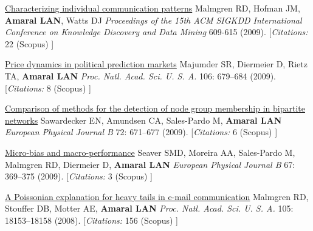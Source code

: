 \NumberedItem{\makebox[0.8cm][r]{[82]}}
\href{/people/amaral/characterizing-individual-communication-patterns}
{Characterizing individual communication patterns}
\newline
Malmgren RD, Hofman JM, {\textbf{Amaral LAN}}, Watts DJ
\newline
\textit{Proceedings of the 15th ACM SIGKDD International Conference on Knowledge Discovery and Data Mining}
609-615 (2009).
    [{\em{Citations:}}  22 (Scopus) ]
\newline
\Gap
~
\Gap

\NumberedItem{\makebox[0.8cm][r]{[81]}}
\href{/people/amaral/price-dynamics-in-political-prediction-markets}
{Price dynamics in political prediction markets}
\newline
Majumder SR, Diermeier D, Rietz TA, {\textbf{Amaral LAN}}
\newline
\textit{Proc. Natl. Acad. Sci. U. S. A.}
    106:
679--684 (2009).
    [{\em{Citations:}}  8 (Scopus) ]
\newline
\Gap
~
\Gap

\NumberedItem{\makebox[0.8cm][r]{[80]}}
\href{/people/amaral/comparison-of-methods-for-the-detection-of-node-group-membership-in-bipartite-networks}
{Comparison of methods for the detection of node group membership in bipartite networks}
\newline
Sawardecker EN, Amundsen CA, Sales-Pardo M, {\textbf{Amaral LAN}}
\newline
\textit{European Physical Journal B}
    72:
671--677 (2009).
    [{\em{Citations:}}  6 (Scopus) ]
\newline
\Gap
~
\Gap

\NumberedItem{\makebox[0.8cm][r]{[79]}}
\href{/people/amaral/micro-bias-and-macro-performance}
{Micro-bias and macro-performance}
\newline
Seaver SMD, Moreira AA, Sales-Pardo M, Malmgren RD, Diermeier D, {\textbf{Amaral LAN}}
\newline
\textit{European Physical Journal B}
    67:
369--375 (2009).
    [{\em{Citations:}}  3 (Scopus) ]
\newline
\Gap
~
\Gap

\NumberedItem{\makebox[0.8cm][r]{[78]}}
\href{/people/amaral/a-poissonian-explanation-for-heavy-tails-in-e-mail-communication}
{A Poissonian explanation for heavy tails in e-mail communication}
\newline
Malmgren RD, Stouffer DB, Motter AE, {\textbf{Amaral LAN}}
\newline
\textit{Proc. Natl. Acad. Sci. U. S. A.}
    105:
18153--18158 (2008).
    [{\em{Citations:}}  156 (Scopus) ]
\newline
\Gap
~
\Gap

